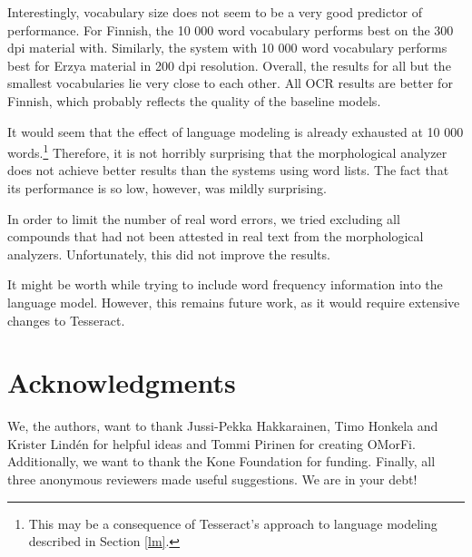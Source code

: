 \documentclass[b5paper]{article}
\begin{document}
Interestingly, vocabulary size does not seem to be a very good
predictor of performance. For Finnish, the 10 000 word vocabulary
performs best on the 300 dpi material with. Similarly, the system with
10 000 word vocabulary performs best for Erzya material in 200 dpi
resolution. Overall, the results for all but the smallest vocabularies
lie very close to each other. All OCR results are better for Finnish,
which probably reflects the quality of the baseline models.

It would seem that the effect of language modeling is already
exhausted at 10 000 words.\footnote{This may be a consequence of
  Tesseract's approach to language modeling described in Section
  \ref{lm}.}  Therefore, it is not horribly surprising that the
morphological analyzer does not achieve better results than the
systems using word lists. The fact that its performance is so low,
however, was mildly surprising.

In order to limit the number of real word errors, we tried excluding
all compounds that had not been attested in real text from the
morphological analyzers. Unfortunately, this did not improve the
results.

It might be worth while trying to include word frequency information into
the language model. However, this remains future work, as it would
require extensive changes to Tesseract.

\section*{Acknowledgments}
We, the authors, want to thank Jussi-Pekka Hakkarainen, Timo Honkela
and Krister Lind\'{e}n for helpful ideas and Tommi Pirinen for
creating OMorFi. Additionally, we want to thank the Kone Foundation
for funding. Finally, all three anonymous reviewers made useful
suggestions. We are in your debt!



\end{document}
